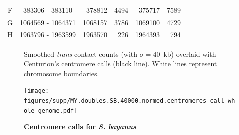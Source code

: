 \begin{table}[ht!]
\begin{center}
\begin{tabular}{c | c  r  r  r  r}
F & \num[group-separator={\,}]{383306} - \num[group-separator={\,}]{383110} & \num[group-separator={\,}]{378812} & \small{\num[group-separator={\,}]{4494}}  & \num[group-separator={\,}]{375717} & \small{\num[group-separator={\,}]{7589}}  \\
G & \num[group-separator={\,}]{1064569} - \num[group-separator={\,}]{1064371} & \num[group-separator={\,}]{1068157} & \small{\num[group-separator={\,}]{3786}}  & \num[group-separator={\,}]{1069100} & \small{\num[group-separator={\,}]{4729}}  \\
H & \num[group-separator={\,}]{1963796} - \num[group-separator={\,}]{1963599} & \num[group-separator={\,}]{1963570} & \small{\num[group-separator={\,}]{226}}  & \num[group-separator={\,}]{1964393} & \small{\num[group-separator={\,}]{794}}  \\
\end{tabular}
\end{center}
\end{table}
\clearpage



\begin{figure}[ht!]
\caption{\textbf{Centromere calls for \textit{S. bayanus}}}{
Smoothed \textit{trans} contact counts (with $\sigma=40$~kb) overlaid with
Centurion's centromere calls (black line). White lines represent chromosome
boundaries.
}
\begin{center}
\texttt{[image: figures/supp/MY.doubles.SB.40000.normed.centromeres\_call\_whole\_genome.pdf]}
\end{center}
\label{suppfig:SB_calls}
\end{figure}


